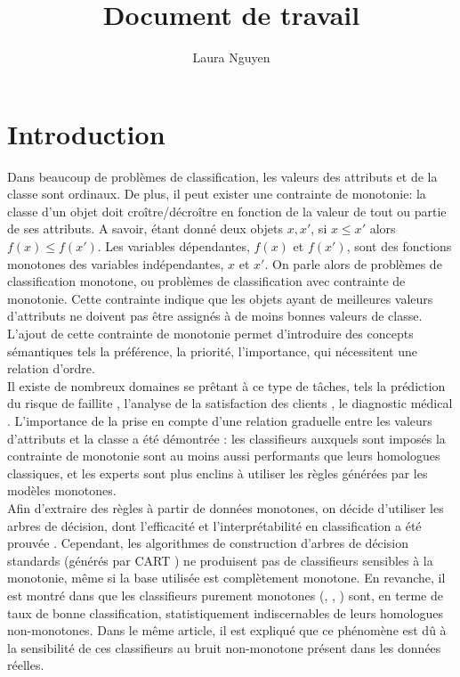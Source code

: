\documentclass[a4paper]{article}
\title{Document de travail}
\author{Laura Nguyen}
\begin{document}
\maketitle

\section{Introduction} Dans beaucoup de problèmes de classification, les valeurs
des attributs et de la classe sont ordinaux. De plus, il peut exister une
contrainte de monotonie: la classe d'un objet doit croître/décroître en fonction
de la valeur de tout ou partie de ses attributs.  A savoir, étant donné deux
objets $x, x'$, si $x \leq x'$ alors $f(x) \leq f(x')$. Les variables
dépendantes, $f(x)$ et $f(x')$, sont des fonctions monotones des variables
indépendantes, $x$ et $x'$.
On parle alors de problèmes de classification monotone, ou problèmes de
classification avec contrainte de monotonie. Cette contrainte indique que les
objets ayant de meilleures valeurs d'attributs ne doivent pas être assignés à de
moins bonnes valeurs de classe.\\
L'ajout de cette contrainte de monotonie permet d'introduire des concepts
sémantiques tels la préférence, la priorité, l'importance, qui nécessitent une
relation d'ordre.\\ Il existe de nombreux domaines se prêtant à ce type de
tâches, tels la prédiction du risque de faillite \cite{greco-new-bankruptcy},
l'analyse de la satisfaction des clients \cite{greco-customer}, le diagnostic
médical \cite{marsala-gradual}. 
L'importance de la prise en compte d'une relation graduelle entre les valeurs
d'attributs et la classe a été démontrée \cite{pazzani-acceptance}: les
classifieurs auxquels sont imposés la contrainte de monotonie sont au moins
aussi performants que leurs homologues classiques, et les experts sont plus
enclins à utiliser les règles générées par les modèles monotones.\\
Afin d'extraire des règles à partir de données monotones, on décide d'utiliser
les arbres de décision, dont l'efficacité et l'interprétabilité en
classification a été prouvée \cite{quinlan-induction}.  Cependant, les
algorithmes de construction d'arbres de décision standards (générés par CART
\cite{leo-classification}) ne produisent pas de classifieurs sensibles à la
monotonie, même si la base utilisée est complètement monotone.  En revanche, il
est montré dans \cite{ben-adding} que les classifieurs purement monotones
(\cite{ben-learning}, \cite{ben-monotonicity}, \cite{cao-consistent}) sont, en
terme de taux de bonne classification, statistiquement indiscernables de leurs
homologues non-monotones.  Dans le même article, il est expliqué que ce
phénomène est dû à la sensibilité de ces classifieurs au bruit non-monotone
présent dans les données réelles. \\
\end{document}
